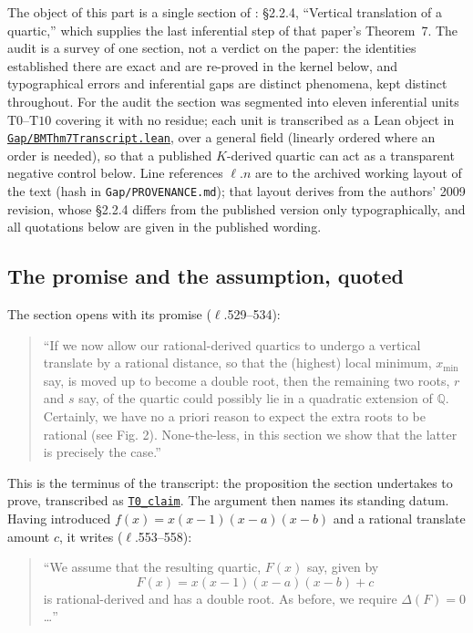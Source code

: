 \documentclass[11pt]{amsart}
\newcommand{\Q}{\mathbb{Q}}
\newcommand{\repourl}{https://github.com/hirokifukui/rd-quartics-classification}
\newcommand{\repotag}{v1.1.0}
\newcommand{\leanfile}[1]{\href{\repourl/blob/\repotag/#1}{\texttt{#1}}}
\newcommand{\leanline}[3]{\href{\repourl/blob/\repotag/#1\#L#2}{\texttt{#3}}}
\begin{document}
The object of this part is a single section of \cite{BM2000}:
\S2.2.4, ``Vertical translation of a quartic,'' which supplies the last
inferential step of that paper's Theorem~7.  The audit is a survey of
one section, not a verdict on the paper: the identities established
there are exact and are re-proved in the kernel below, and
typographical errors and inferential gaps are distinct phenomena, kept
distinct throughout.  For the audit the section was segmented into
eleven inferential units $\mathrm{T0}$--$\mathrm{T10}$ covering it with
no residue; each unit is transcribed as a Lean object in
\leanfile{Gap/BMThm7Transcript.lean}, over a general field (linearly
ordered where an order is needed), so that a published $K$-derived
quartic can act as a transparent negative control below.  Line
references $\ell.n$ are to the archived working layout of the text
(hash in \texttt{Gap/PROVENANCE.md}); that layout derives from the
authors' 2009 revision, whose \S2.2.4 differs from the published
version only typographically, and all quotations below are given in the
published wording.

\subsection{The promise and the assumption, quoted}\label{sec:gap:quotes}

The section opens with its promise ($\ell$.529--534):

\begin{quote}\small
``If we now allow our rational-derived quartics to undergo a vertical
translate by a rational distance, so that the (highest) local minimum,
$x_{\min}$ say, is moved up to become a double root, then the remaining
two roots, $r$ and $s$ say, of the quartic could possibly lie in a
quadratic extension of $\Q$. Certainly, we have no a priori reason to
expect the extra roots to be rational (see Fig. 2). None-the-less, in
this section we show that the latter is precisely the case.''
\end{quote}

\noindent This is the terminus of the transcript: the proposition the
section undertakes to prove, transcribed as
\leanline{Gap/BMThm7Transcript.lean}{201}{T0\_claim}.  The argument
then names its standing datum.  Having introduced
$f(x)=x(x-1)(x-a)(x-b)$ and a rational translate amount $c$, it writes
($\ell$.553--558):

\begin{quote}\small
``We assume that the resulting quartic, $F(x)$ say, given by
\[
F(x) = x(x-1)(x-a)(x-b) + c \tag{4}
\]
is rational-derived and has a double root. As before, we require
$\Delta(F)=0$\dots''
\end{quote}
\end{document}
